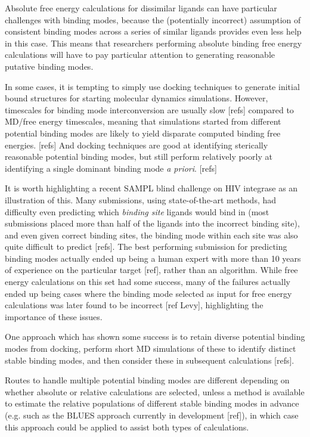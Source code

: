 \documentclass[9pt,bestpractices]{livecoms}
\begin{document}
Absolute free energy calculations for dissimilar ligands can have particular challenges with binding modes, because the (potentially incorrect) assumption of consistent binding modes across a series of similar ligands provides even less help in this case.
This means that researchers performing absolute binding free energy calculations will have to pay particular attention to generating reasonable putative binding modes.

In some cases, it is tempting to simply use docking techniques to generate initial bound structures for starting molecular dynamics simulations.
However, timescales for binding mode interconversion are usually slow [refs] compared to MD/free energy timescales, meaning that simulations started from different potential binding modes are likely to yield disparate computed binding free energies. [refs]
And docking techniques are good at identifying sterically reasonable potential binding modes, but still perform relatively poorly at identifying a single dominant binding mode \emph{a priori}. [refs] 

It is worth highlighting a recent SAMPL blind challenge on HIV integrase as an illustration of this. 
Many submissions, using state-of-the-art methods, had difficulty even predicting which \emph{binding site} ligands would bind in (most submissions placed more than half of the ligands into the incorrect binding site), and even given correct binding sites, the binding mode within each site was also quite difficult to predict [refs].
The best performing submission for predicting binding modes actually ended up being a human expert with more than 10 years of experience on the particular target [ref], rather than an algorithm.
While free energy calculations on this set had some success, many of the failures actually ended up being cases where the binding mode selected as input for free energy calculations was later found to be incorrect [ref Levy], highlighting the importance of these issues.

One approach which has shown some success is to retain diverse potential binding modes from docking, perform short MD simulations of these to identify distinct stable binding modes, and then consider these in subsequent calculations [refs].

Routes to handle multiple potential binding modes are different depending on whether absolute or relative calculations are selected, unless a method is available to estimate the relative populations of different stable binding modes in advance (e.g. such as the BLUES approach currently in development [ref]), in which case this approach could be applied to assist both types of calculations.
\end{document}
